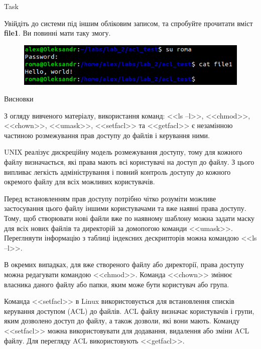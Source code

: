 \documentclass[a4paper,12pt]{article}
\newcommand{\RomanNumeralCaps}[1]{\MakeUppercase{\romannumeral #1}}
\begin{document}
    \begin{center}
        \Large{Task \RomanNumeralCaps{22}}
    \end{center}
    Увійдіть до системи під іншим обліковим записом, та спробуйте прочитати вміст \textbf{file1}. Ви повинні мати таку змогу.
    \begin{figure}[h!]
        \begin{minipage}[h]{1\linewidth}
            \centering
            \includegraphics[width=0.6\linewidth]{Prt sc/Figure_22.png}  
        \end{minipage}
    \end{figure}

    \begin{center}
        \Large{Висновки}
    \end{center}
    
    З огляду вивченого матеріалу, використання команд: <<ls –l>>, <<chmod>>, <<chown>>, <<umask>>, <<setfacl>> та <<getfacl>> є незамінною частиною 
    розмежування прав доступу до файлів і керування ними.

    UNIX реалізує дискреційну модель розмежування доступу, тому для кожного файлу визначається, які права мають всі користувачі на доступ до файлу.
    З цього випливає легкість адміністрування і повний контроль доступу до кожного окремого файлу для всіх можливих користувачів. 
    
    Перед встановленням прав доступу потрібно чітко розуміти можливе застосування цього файлу іншими користувачами та вже наявні права доступу.
    Тому, щоб створювати нові файли вже по наявному шаблону можна задати маску для всіх нових файлів та директорій за домопогою команди <<umask>>. 
    Переглняути інформацію з таблиці індексних дескрипторів можна командою <<ls –l>>. 

    В окремих випадках, для вже створеного файлу або директорії, права доступу можна редагувати командою <<chmod>>. 
    Команда <<chown>> змінює власника даного файлу або папки, яким може бути користувач або група. 

    Команда <<setfacl>> в Linux використовується для встановлення списків керування доступом (ACL) до файлів. 
    ACL файлу визначає користувачів і групи, яким дозволено доступ до файлу, а також дозволи, які вони мають. 
    Команду <<setfacl>> можна використовувати для додавання, видалення або зміни ACL файлу. Для перегляду ACL використовують <<getfacl>>.
\end{document}
